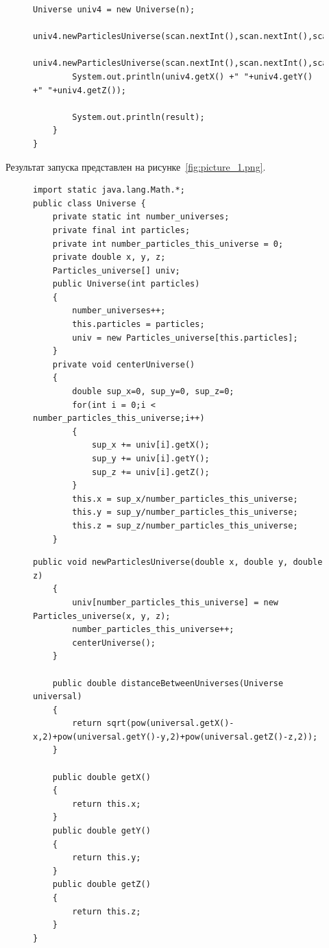 \documentclass[a4paper, 14pt]{extarticle}
\begin{document}
\newpage

\begin{figure}[!htb]
\begin{lstlisting}[language={},caption={Нахождение расстояния между двумя вселенными (Класс Maine)(продолжение)},label={lst:code2}]
        Universe univ4 = new Universe(n);
        univ4.newParticlesUniverse(scan.nextInt(),scan.nextInt(),scan.nextInt());
        univ4.newParticlesUniverse(scan.nextInt(),scan.nextInt(),scan.nextInt());
        System.out.println(univ4.getX() +" "+univ4.getY() +" "+univ4.getZ());

        System.out.println(result);
    }
}
\end{lstlisting}
\end{figure}

Результат запуска представлен на рисунке~\ref{fig:picture_1.png}.

\begin{figure}[!htb]
\begin{lstlisting}[language={},caption={Нахождение расстояния между двумя вселенными (Класс Universe)},label={lst:code3}]
import static java.lang.Math.*;
public class Universe {
    private static int number_universes;
    private final int particles;
    private int number_particles_this_universe = 0;
    private double x, y, z;
    Particles_universe[] univ;
    public Universe(int particles)
    {
        number_universes++;
        this.particles = particles;
        univ = new Particles_universe[this.particles];
    }
    private void centerUniverse()
    {
        double sup_x=0, sup_y=0, sup_z=0;
        for(int i = 0;i < number_particles_this_universe;i++)
        {
            sup_x += univ[i].getX();
            sup_y += univ[i].getY();
            sup_z += univ[i].getZ();
        }
        this.x = sup_x/number_particles_this_universe;
        this.y = sup_y/number_particles_this_universe;
        this.z = sup_z/number_particles_this_universe;
    }

\end{lstlisting}
\end{figure}

\begin{figure}[!htb]
\begin{lstlisting}[language={},caption={Нахождение расстояния между двумя вселенными (Класс Universe)(продолжение)},label={lst:code4}]
    public void newParticlesUniverse(double x, double y, double z)
    {
        univ[number_particles_this_universe] = new Particles_universe(x, y, z);
        number_particles_this_universe++;
        centerUniverse();
    }

    public double distanceBetweenUniverses(Universe universal)
    {
        return sqrt(pow(universal.getX()-x,2)+pow(universal.getY()-y,2)+pow(universal.getZ()-z,2));
    }
    
    public double getX()
    {
        return this.x;
    }
    public double getY()
    {
        return this.y;
    }
    public double getZ()
    {
        return this.z;
    }
}
\end{lstlisting}
\end{figure}
\end{document}

